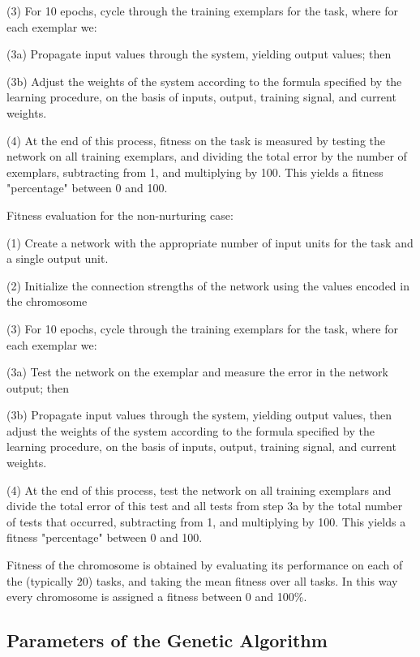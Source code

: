 \documentclass[master]{outhesis}
\begin{document}
(3) For 10 epochs, cycle through the training exemplars for the task, where for each exemplar we:

(3a) Propagate input values through the system, yielding output values; then

(3b) Adjust the weights of the system according to the formula specified by the learning procedure, on the basis of inputs, output, training signal, and current weights.

(4) At the end of this process, fitness on the task is measured by testing the network on all training exemplars, and dividing the total error by the number of exemplars, subtracting from 1, and multiplying by 100. This yields a fitness "percentage" between 0 and 100.

Fitness evaluation for the non-nurturing case:

(1) Create a network with the appropriate number of input units for the task and a single output unit.

(2) Initialize the connection strengths of the network using the values encoded in the chromosome

(3) For 10 epochs, cycle through the training exemplars for the task, where for each exemplar we:

(3a) Test the network on the exemplar and measure the error in the network output; then

(3b) Propagate input values through the system, yielding output values, then adjust the weights of the system according to the formula specified by the learning procedure, on the basis of inputs, output, training signal, and current weights.

(4) At the end of this process, test the network on all training exemplars and divide the total error of this test and all tests from step 3a by the total number of tests that occurred, subtracting from 1, and multiplying by 100. This yields a fitness "percentage" between 0 and 100.

Fitness of the chromosome is obtained by evaluating its performance on each of the (typically 20) tasks, and taking the mean fitness over all tasks. In this way every chromosome is assigned a fitness between 0 and 100\%.

\subsection{Parameters of the Genetic Algorithm}

\end{document}
